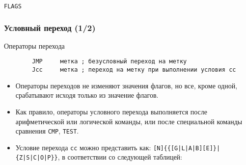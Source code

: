 \documentclass[pdf,9pt,aspectratio=169]{beamer}
\newcommand{\cl}[1]{\texttt{#1}}
\begin{document}
\begin{frame}[fragile]
\begin{block}{\texttt{FLAGS}}
\begin{center}
    \end{center}
  \end{block}
\end{frame}

\begin{frame}[fragile]\frametitle{Условный переход (1/2)}
  \begin{block}{Операторы перехода}
    \begin{verbatim}
        JMP     метка ; безусловный переход на метку
        Jcc     метка ; переход на метку при выполнении условия сс
    \end{verbatim}
  \end{block}
  \begin{block}{}
    \begin{itemize}
      \item Операторы переходов не изменяют значения флагов, но все, кроме одной, срабатывают исходя только из значение флагов.
      \item Как правило, операторы условного перехода выполняется после арифметической или логической команды, или после специальной команды сравнения \cl{CMP}, \cl{TEST}.
      \item Условие перехода \cl{сс} можно представить как: \cl{[N]\{\{[G|L|A|B][E]\}|\{Z|S|C|O|P\}\}}, в соответствии со следующей таблицей:
    \end{itemize}
  \end{block}
\end{frame}
\end{document}
